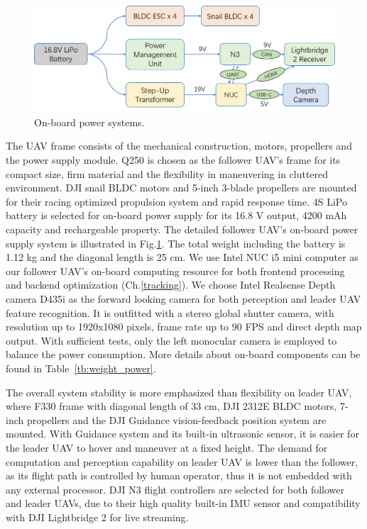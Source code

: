 \begin{figure}[ht]
  \centering
  \includegraphics[width=1.0\textwidth]{figure/chapter_4/power_system.png}
  \caption{On-board power systems.}
  \label{fig:power_systems}
\end{figure}

The UAV frame consists of the mechanical construction, motors, propellers and the power supply module. Q250 is chosen as the follower UAV's frame for its compact size, firm material and the flexibility in maneuvering in cluttered environment. DJI snail BLDC motors and 5-inch 3-blade propellers are mounted for their racing optimized propulsion system and rapid response time. 4S LiPo battery is selected for on-board power supply for its 16.8 V output, 4200 mAh capacity and rechargeable property. The detailed follower UAV's on-board power supply system is illustrated in Fig.\ref{fig:power_systems}. The total weight including the battery is 1.12 kg and the diagonal length is 25 cm. We use Intel NUC i5 mini computer as our follower UAV's on-board computing resource for both frontend processing and backend optimization (Ch.\ref{tracking}). We choose Intel Realsense Depth camera D435i as the forward looking camera for both perception and leader UAV feature recognition. It is outfitted with a stereo global shutter camera, with resolution up to 1920x1080 pixels, frame rate up to 90 FPS and direct depth map output. With sufficient tests, only the left monocular camera is employed to balance the power consumption. More details about on-board components can be found in Table~\ref{tb:weight_power}.

The overall system stability is more emphasized than flexibility on leader UAV, where F330 frame with diagonal length of 33 cm, DJI 2312E BLDC motors, 7-inch propellers and the DJI Guidance vision-feedback position system are mounted. With Guidance system and its built-in ultrasonic sensor, it is easier for the leader UAV to hover and maneuver at a fixed height. The demand for computation and perception capability on leader UAV is lower than the follower, as its flight path is controlled by human operator, thus it is not embedded with any external processor. DJI N3 flight controllers are selected for both follower and leader UAVs, due to their high quality built-in IMU sensor and compatibility with DJI Lightbridge 2 for live streaming.

